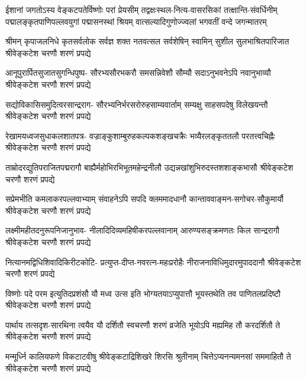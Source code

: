 
\fourlineindentedshloka
{ईशानां जगतोऽस्य वेङ्कटपतेर्विष्णोः परां प्रेयसीम्}
{तद्वक्षःस्थल-नित्य-वासरसिकां तत्क्षान्ति-संवर्धिनीम्}
{पद्मालङ्कृतपाणिपल्लवयुगां पद्मासनस्थां श्रियम्}
{वात्सल्यादिगुणोज्ज्वलां भगवतीं वन्दे जगन्मातरम्}

\begin{AutoCols}[\maxColumns]
\adjustShlokaSpaceSkip

\fourlineindentedshloka
{श्रीमन् कृपाजलनिधे कृतसर्वलोक}
{सर्वज्ञ शक्त नतवत्सल सर्वशेषिन्}
{स्वामिन् सुशील सुलभाश्रितपारिजात}
{श्रीवेङ्कटेश चरणौ शरणं प्रपद्ये}

\fourlineindentedshloka
{आनूपुरार्पितसुजातसुगन्धिपुष्प-}
{सौरभ्यसौरभकरौ समसन्निवेशौ}
{सौम्यौ सदाऽनुभवनेऽपि नवानुभाव्यौ}
{श्रीवेङ्कटेश चरणौ शरणं प्रपद्ये}

\fourlineindentedshloka
{सद्योविकासिसमुदित्वरसान्द्रराग-}
{सौरभ्यनिर्भरसरोरुहसाम्यवार्ताम्}
{सम्यक्षु साहसपदेषु विलेखयन्तौ}
{श्रीवेङ्कटेश चरणौ शरणं प्रपद्ये}

\fourlineindentedshloka
{रेखामयध्वजसुधाकलशातपत्र-}
{वज्राङ्कुशाम्बुरुहकल्पकशङ्खचक्रैः}
{भव्यैरलङ्कृततलौ परतत्त्वचिह्नैः}
{श्रीवेङ्कटेश चरणौ शरणं प्रपद्ये}

\fourlineindentedshloka
{ताम्रोदरद्युतिपराजितपद्मरागौ}
{बाह्यैर्महोभिरभिभूतमहेन्द्रनीलौ}
{उद्यन्नखांशुभिरुदस्तशशाङ्कभासौ}
{श्रीवेङ्कटेश चरणौ शरणं प्रपद्ये}

\fourlineindentedshloka
{सप्रेमभीति कमलाकरपल्लवाभ्याम्}
{संवाहनेऽपि सपदि क्लममादधानौ}
{कान्ताववाङ्मन-सगोचर-सौकुमार्यौ}
{श्रीवेङ्कटेश चरणौ शरणं प्रपद्ये}

\fourlineindentedshloka
{लक्ष्मीमहीतदनुरूपनिजानुभाव-}
{नीलादिदिव्यमहिषीकरपल्लवानाम्}
{आरुण्यसङ्क्रमणतः किल सान्द्ररागौ}
{श्रीवेङ्कटेश चरणौ शरणं प्रपद्ये}

\fourlineindentedshloka
{नित्यानमद्विधिशिवादिकिरीटकोटि-}
{प्रत्युप्त-दीप्त-नवरत्न-महःप्ररोहैः}
{नीराजनाविधिमुदारमुपाददानौ}
{श्रीवेङ्कटेश चरणौ शरणं प्रपद्ये}

\fourlineindentedshloka
{विष्णोः पदे परम इत्युतिदप्रशंसौ}
{यौ मध्व उत्स इति भोग्यतयाऽप्युपात्तौ}
{भूयस्तथेति तव पाणितलप्रदिष्टौ}
{श्रीवेङ्कटेश चरणौ शरणं प्रपद्ये}

\fourlineindentedshloka
{पार्थाय तत्सदृश-सारथिना त्वयैव}
{यौ दर्शितौ स्वचरणौ शरणं व्रजेति}
{भूयोऽपि मह्यमिह तौ करदर्शितौ ते}
{श्रीवेङ्कटेश चरणौ शरणं प्रपद्ये}

\fourlineindentedshloka
{मन्मूर्ध्नि कालियफणे विकटाटवीषु}
{श्रीवेङ्कटाद्रिशिखरे शिरसि श्रुतीनाम्}
{चित्तेऽप्यनन्यमनसां सममाहितौ ते}
{श्रीवेङ्कटेश चरणौ शरणं प्रपद्ये}


\end{AutoCols}
